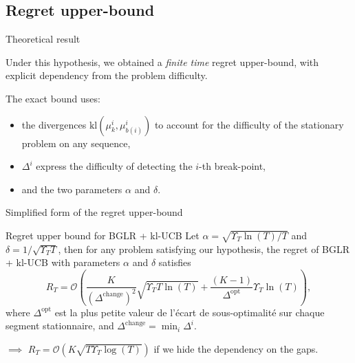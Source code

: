 \documentclass[11pt,english,ignorenonframetext,]{beamer}
\begin{document}
\subsection{\hfill{}Regret upper-bound\hfill{}}

\begin{frame}{Theoretical result}

  Under this hypothesis, we obtained a \emph{finite time}
  regret upper-bound, with explicit dependency from the problem difficulty.

  The exact bound uses:
  \begin{itemize}
    \item
    the divergences $\mathrm{kl}(\mu_{k}^{i},\mu_{b(i)}^{i})$ to account for the difficulty of the stationary problem on any sequence,
    \item
    $\Delta^{i}$ express the difficulty of detecting the $i$-th break-point,
    \item
    and the two parameters $\alpha$ and $\delta$.
  \end{itemize}

\end{frame}


\begin{frame}{Simplified form of the regret upper-bound}

  \begin{block}{Regret upper bound for BGLR + kl-UCB}
    Let $\alpha = \sqrt{\Upsilon_T \ln(T) / T}$ and $\delta = 1 / \sqrt{\Upsilon_T T}$,
    then for any problem satisfying our hypothesis,
    the regret of BGLR + kl-UCB with parameters $\alpha$ and $\delta$ satisfies
    \[ R_T =\mathcal{O}\left( \frac{K}{\left(\Delta^{\text{change}}\right)^2}\sqrt{\Upsilon_T T \ln(T)} + \frac{(K-1)}{\Delta^{\text{opt}}} \Upsilon_T\ln(T) \right),\]
    where $\Delta^{\text{opt}}$ est la plus petite valeur de l'écart de sous-optimalité sur chaque segment stationnaire,
    and $\Delta^{\text{change}} = \min_{i} \Delta^{i}$.
\end{block}

$\implies$ $R_T = \mathcal{O}(K \sqrt{T \Upsilon_T \log(T)})$ if we hide the dependency on the gaps.

\end{frame}
\end{document}
